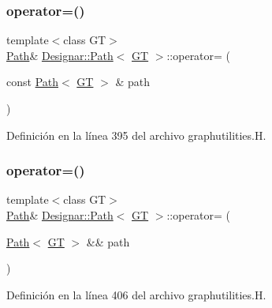 \subsubsection{\texorpdfstring{operator=()}{operator=()}\hspace{0.1cm}{\footnotesize\ttfamily [1/2]}}
{\footnotesize\ttfamily template$<$class GT$>$ \\
\hyperlink{class_designar_1_1_path}{Path}\& \hyperlink{class_designar_1_1_path}{Designar\+::\+Path}$<$ \hyperlink{demo-buildgraph_8_c_a3001c40d2c31ca87ed96cd7d1334a55e}{GT} $>$\+::operator= (\begin{DoxyParamCaption}\item[{const \hyperlink{class_designar_1_1_path}{Path}$<$ \hyperlink{demo-buildgraph_8_c_a3001c40d2c31ca87ed96cd7d1334a55e}{GT} $>$ \&}]{path }\end{DoxyParamCaption})\hspace{0.3cm}{\ttfamily [inline]}}



Definición en la línea 395 del archivo graphutilities.\+H.

\mbox{\label{class_designar_1_1_path_af84a6745c52225e5588db4a2ed5d828e}} 
\subsubsection{\texorpdfstring{operator=()}{operator=()}\hspace{0.1cm}{\footnotesize\ttfamily [2/2]}}
{\footnotesize\ttfamily template$<$class GT$>$ \\
\hyperlink{class_designar_1_1_path}{Path}\& \hyperlink{class_designar_1_1_path}{Designar\+::\+Path}$<$ \hyperlink{demo-buildgraph_8_c_a3001c40d2c31ca87ed96cd7d1334a55e}{GT} $>$\+::operator= (\begin{DoxyParamCaption}\item[{\hyperlink{class_designar_1_1_path}{Path}$<$ \hyperlink{demo-buildgraph_8_c_a3001c40d2c31ca87ed96cd7d1334a55e}{GT} $>$ \&\&}]{path }\end{DoxyParamCaption})\hspace{0.3cm}{\ttfamily [inline]}}



Definición en la línea 406 del archivo graphutilities.\+H.

\mbox{\label{class_designar_1_1_path_a88a313439c8f4ea01f72d469b328039f}} 
